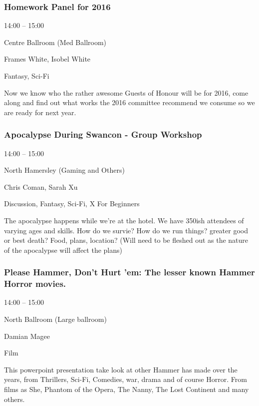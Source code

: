 \documentclass{scrreprt}
\begin{document}
\begin{multicols}{2}
\subsubsection*{Homework Panel for 2016}\begin{description}
\setlength{\itemsep}{0pt}
\setlength{\parsep}{0pt}
\setlength{\parskip}{0pt}
\item[Time:]{14:00 -- 15:00}
\item[Venue:]{Centre Ballroom (Med Ballroom)}
\item[People:]{Frames White, Isobel White}
\item[Tags:]{Fantasy, Sci-Fi}\end{description}
Now we know who the rather awesome Guests of Honour will be for 2016, come along and find out what works the 2016 committee recommend we consume so we are ready for next year.
\subsubsection*{Apocalypse During Swancon - Group Workshop}\begin{description}
\setlength{\itemsep}{0pt}
\setlength{\parsep}{0pt}
\setlength{\parskip}{0pt}
\item[Time:]{14:00 -- 15:00}
\item[Venue:]{North Hamersley (Gaming and Others)}
\item[People:]{Chris Coman, Sarah Xu}
\item[Tags:]{Discussion, Fantasy, Sci-Fi, X For Beginners}\end{description}
The apocalypse happens while we’re at the hotel. We have 350ish attendees of varying ages and skills. How do we survie? How do we run things? greater good or best death? Food, plans, location? (Will need to be fleshed out as the nature of the apocalypse will affect the plans)
\subsubsection*{Please Hammer, Don't Hurt 'em: The lesser known Hammer Horror movies.}\begin{description}
\setlength{\itemsep}{0pt}
\setlength{\parsep}{0pt}
\setlength{\parskip}{0pt}
\item[Time:]{14:00 -- 15:00}
\item[Venue:]{North Ballroom (Large ballroom)}
\item[People:]{Damian Magee}
\item[Tags:]{Film}\end{description}
This powerpoint presentation take look at other Hammer has made over the years, from Thrillers, Sci-Fi, Comedies, war, drama and of course Horror. From films as She, Phantom of the Opera, The Nanny, The Lost Continent and many others.

\end{multicols}
\end{document}
